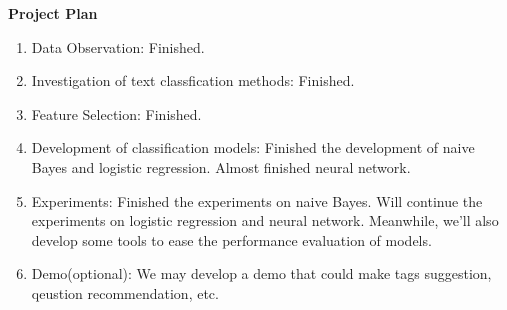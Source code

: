 {\bf Project Plan}
\begin{enumerate}
    \item Data Observation: Finished.
    \item Investigation of text classfication methods: Finished.
    \item Feature Selection: Finished.
    \item Development of classification models: Finished the development of naive Bayes and logistic regression. Almost finished neural network.
    \item Experiments: Finished the experiments on naive Bayes. Will continue the experiments on logistic regression and neural network. Meanwhile, we'll also develop some tools to ease the performance evaluation of models.
    \item Demo(optional): We may develop a demo that could make tags suggestion, qeustion recommendation, etc.
\end{enumerate}
